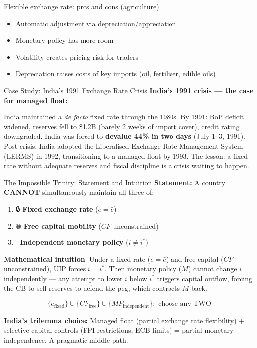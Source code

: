 \documentclass[
  ignorenonframetext,
  aspectratio=169,
]{beamer}
\makeatletter
\providecommand{\tightlist}{%
  \setlength{\itemsep}{0pt}\setlength{\parskip}{0pt}}
\let\quarto@originallabel\label
\DeclareRobustCommand*{\label}[1]{\quarto@originallabel{#1}}
\makeatother
\begin{document}
\begin{frame}{Flexible exchange rate: pros and cons (agriculture)}
\label{flexible-exchange-rate-pros-and-cons-agriculture}
\begin{itemize}
\tightlist
\item
  Automatic adjustment via depreciation/appreciation
\item
  Monetary policy has more room
\item
  Volatility creates pricing risk for traders
\item
  Depreciation raises costs of key imports (oil, fertiliser, edible
  oils)
\end{itemize}
\end{frame}

\begin{frame}{Case Study: India's 1991 Exchange Rate Crisis}
\label{case-study-indias-1991-exchange-rate-crisis}
\textbf{India's 1991 crisis --- the case for managed float:}

India maintained a \emph{de facto} fixed rate through the 1980s. By
1991: BoP deficit widened, reserves fell to \$1.2B (barely 2 weeks of
import cover), credit rating downgraded. India was forced to
\textbf{devalue 44\% in two days} (July 1--3, 1991). Post-crisis, India
adopted the Liberalised Exchange Rate Management System (LERMS) in 1992,
transitioning to a managed float by 1993. The lesson: a fixed rate
without adequate reserves and fiscal discipline is a crisis waiting to
happen.
\end{frame}

\begin{frame}{The Impossible Trinity: Statement and Intuition}
\label{the-impossible-trinity-statement-and-intuition}
\textbf{Statement:} A country \textbf{CANNOT} simultaneously maintain
all three of:

\begin{enumerate}
\tightlist
\item
  🔒 \textbf{Fixed exchange rate} (\(e = \bar{e}\))
\item
  🌐 \textbf{Free capital mobility} (\(CF\) unconstrained)
\item
  🏦 \textbf{Independent monetary policy} (\(i \neq i^*\))
\end{enumerate}

\textbf{Mathematical intuition:} Under a fixed rate (\(e = \bar{e}\))
and free capital (\(CF\) unconstrained), UIP forces \(i = i^*\). Then
monetary policy (\(M\)) cannot change \(i\) independently --- any
attempt to lower \(i\) below \(i^*\) triggers capital outflow, forcing
the CB to sell reserves to defend the peg, which contracts \(M\) back.

\[\{e_{\text{fixed}}\} \cup \{CF_{\text{free}}\} \cup \{MP_{\text{independent}}\}: \text{ choose any TWO}\]

\textbf{India's trilemma choice:} Managed float (partial exchange rate
flexibility) + selective capital controls (FPI restrictions, ECB limits)
= partial monetary independence. A pragmatic middle path.
\end{frame}
\end{document}
